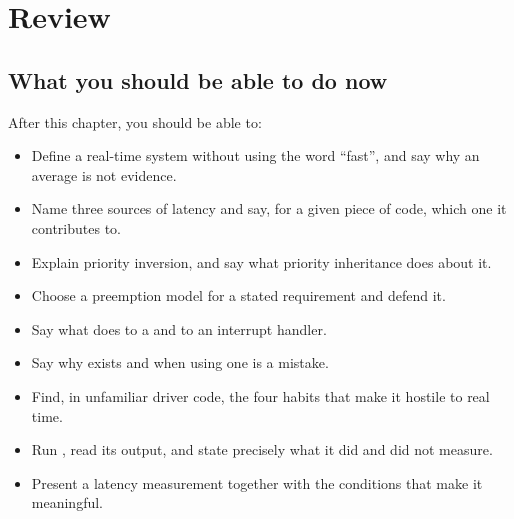 
\section{Review}
\label{c12:sec:review}

\subsection*{What you should be able to do now}
After this chapter, you should be able to:
\begin{itemize}
  \item Define a real-time system without using the word ``fast'', and say why an average is not
    evidence.
  \item Name three sources of latency and say, for a given piece of code, which one it contributes
    to.
  \item Explain priority inversion, and say what priority inheritance does about it.
  \item Choose a preemption model for a stated requirement and defend it.
  \item Say what  does to a  and to an interrupt handler.
  \item Say why  exists and when using one is a mistake.
  \item Find, in unfamiliar driver code, the four habits that make it hostile to real time.
  \item Run , read its output, and state precisely what it did and did not measure.
  \item Present a latency measurement together with the conditions that make it meaningful.
\end{itemize}

